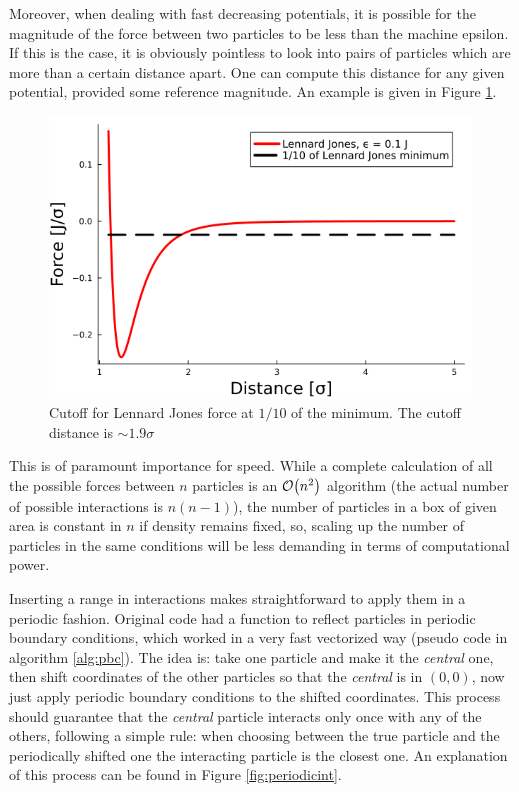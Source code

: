 \documentclass[../../master_thesis_np.tex]{subfiles}
\begin{document}
	Moreover, when dealing with fast decreasing potentials, it is possible for the magnitude of the force between two particles to be less than the machine epsilon. If this is the case, it is obviously pointless to look into pairs of particles which are more than a certain distance apart. One can compute this distance for any given potential, provided some reference magnitude. An example is given in Figure \ref{fig:force_zero}.
	\begin{figure}[htp]
		\centering
		\includegraphics[width=\textwidth]{lj_zero.png}
		\caption{Cutoff for Lennard Jones force at $1/10$ of the minimum. The cutoff distance is $\sim 1.9\sigma$}
		\label{fig:force_zero}
	\end{figure}
	This is of paramount importance for speed. While a complete calculation of all the possible forces between $n$ particles is an $\order{n^2}$ algorithm (the actual number of possible interactions is $n(n-1)$), the number of particles in a box of given area is constant in $n$ if density remains fixed, so, scaling up the number of particles in the same conditions will be less demanding in terms of computational power.
	
	Inserting a range in interactions makes straightforward to apply them in a periodic fashion. Original code had a function to reflect particles in periodic boundary conditions, which worked in a very fast vectorized way (pseudo code in algorithm \ref{alg:pbc}). The idea is: take one particle and make it the \emph{central} one, then shift coordinates of the other particles so that the \emph{central} is in $(0,0)$, now just apply periodic boundary conditions to the shifted coordinates. This process should guarantee that the \emph{central} particle interacts only once with any of the others, following a simple rule: when choosing between the true particle and the periodically shifted one the interacting particle is the closest one. An explanation of this process can be found in Figure \ref{fig:periodicint}.
	
\end{document}
